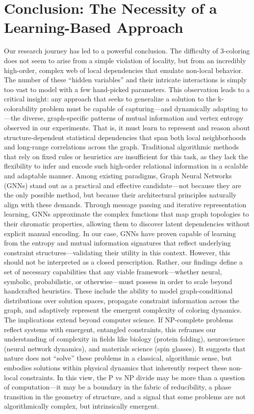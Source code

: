\documentclass[12pt, letterpaper]{article}
\begin{document}
\section{Conclusion: The Necessity of a Learning-Based Approach}
Our research journey has led to a powerful conclusion. The difficulty of 3-coloring does not seem to arise from a simple violation of locality, but from an incredibly high-order, complex web of local dependencies that emulate non-local behavior. The number of these ``hidden variables'' and their intricate interactions is simply too vast to model with a few hand-picked parameters. This observation leads to a critical insight: any approach that seeks to generalize a solution to the k-colorability problem must be capable of capturing—and dynamically adapting to—the diverse, graph-specific patterns of mutual information and vertex entropy observed in our experiments. That is, it must learn to represent and reason about structure-dependent statistical dependencies that span both local neighborhoods and long-range correlations across the graph. Traditional algorithmic methods that rely on fixed rules or heuristics are insufficient for this task, as they lack the flexibility to infer and encode such high-order relational information in a scalable and adaptable manner. Among existing paradigms, Graph Neural Networks (GNNs) stand out as a practical and effective candidate—not because they are the only possible method, but because their architectural principles naturally align with these demands. Through message passing and iterative representation learning, GNNs approximate the complex functions that map graph topologies to their chromatic properties, allowing them to discover latent dependencies without explicit manual encoding. In our case, GNNs have proven capable of learning from the entropy and mutual information signatures that reflect underlying constraint structures—validating their utility in this context. However, this should not be interpreted as a closed prescription. Rather, our findings define a set of necessary capabilities that any viable framework—whether neural, symbolic, probabilistic, or otherwise—must possess in order to scale beyond handcrafted heuristics. These include the ability to model graph-conditional distributions over solution spaces, propagate constraint information across the graph, and adaptively represent the emergent complexity of coloring dynamics. The implications extend beyond computer science. If NP-complete problems reflect systems with emergent, entangled constraints, this reframes our understanding of complexity in fields like biology (protein folding), neuroscience (neural network dynamics), and materials science (spin glasses). It suggests that nature does not ``solve'' these problems in a classical, algorithmic sense, but embodies solutions within physical dynamics that inherently respect these non-local constraints. In this view, the P vs NP divide may be more than a question of computation—it may be a boundary in the fabric of reducibility, a phase transition in the geometry of structure, and a signal that some problems are not algorithmically complex, but intrinsically emergent.
\end{document}
